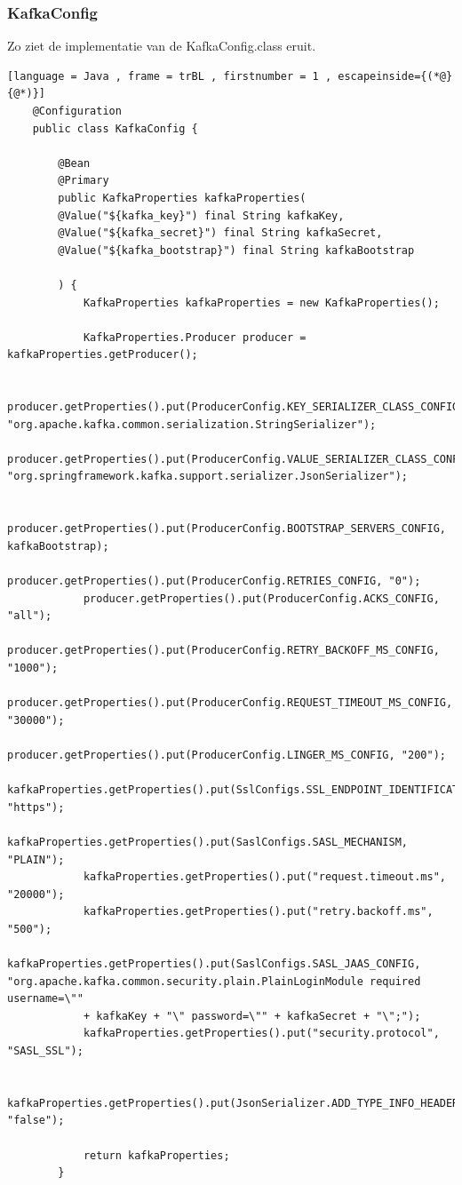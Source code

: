 \subsubsection{KafkaConfig}
Zo ziet de implementatie van de KafkaConfig.class eruit.

    \begin{lstlisting}[language = Java , frame = trBL , firstnumber = 1 , escapeinside={(*@}{@*)}]
    @Configuration
    public class KafkaConfig {
        
        @Bean
        @Primary
        public KafkaProperties kafkaProperties(
        @Value("${kafka_key}") final String kafkaKey,
        @Value("${kafka_secret}") final String kafkaSecret,
        @Value("${kafka_bootstrap}") final String kafkaBootstrap
        
        ) {
            KafkaProperties kafkaProperties = new KafkaProperties();
            
            KafkaProperties.Producer producer = kafkaProperties.getProducer();
            
            producer.getProperties().put(ProducerConfig.KEY_SERIALIZER_CLASS_CONFIG, "org.apache.kafka.common.serialization.StringSerializer");
            producer.getProperties().put(ProducerConfig.VALUE_SERIALIZER_CLASS_CONFIG, "org.springframework.kafka.support.serializer.JsonSerializer");
            
            producer.getProperties().put(ProducerConfig.BOOTSTRAP_SERVERS_CONFIG, kafkaBootstrap);
            producer.getProperties().put(ProducerConfig.RETRIES_CONFIG, "0");
            producer.getProperties().put(ProducerConfig.ACKS_CONFIG, "all");
            producer.getProperties().put(ProducerConfig.RETRY_BACKOFF_MS_CONFIG, "1000");
            producer.getProperties().put(ProducerConfig.REQUEST_TIMEOUT_MS_CONFIG, "30000");
            producer.getProperties().put(ProducerConfig.LINGER_MS_CONFIG, "200");
            kafkaProperties.getProperties().put(SslConfigs.SSL_ENDPOINT_IDENTIFICATION_ALGORITHM_CONFIG, "https");
            kafkaProperties.getProperties().put(SaslConfigs.SASL_MECHANISM, "PLAIN");
            kafkaProperties.getProperties().put("request.timeout.ms", "20000");
            kafkaProperties.getProperties().put("retry.backoff.ms", "500");
            kafkaProperties.getProperties().put(SaslConfigs.SASL_JAAS_CONFIG, "org.apache.kafka.common.security.plain.PlainLoginModule required username=\""
            + kafkaKey + "\" password=\"" + kafkaSecret + "\";");
            kafkaProperties.getProperties().put("security.protocol", "SASL_SSL");
            
            kafkaProperties.getProperties().put(JsonSerializer.ADD_TYPE_INFO_HEADERS, "false");
            
            return kafkaProperties;
        }
            \end{lstlisting}
            
